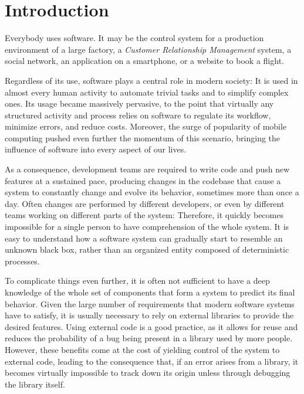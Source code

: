 
\chapter{Introduction}\label{ch:introduction}

Everybody uses software.
It may be the control system for a production environment of a large factory, a \emph{Customer Relationship Management} system, a social network, an application on a smartphone, or a website to book a flight.

Regardless of its use, software plays a central role in modern society: It is used in almost every human activity to automate trivial tasks and to simplify complex ones.
Its usage became massively pervasive, to the point that virtually any structured activity and process relies on software to regulate its workflow, minimize errors, and reduce costs.
Moreover, the surge of popularity of mobile computing pushed even further the momentum of this scenario, bringing the influence of software into every aspect of our lives.

As a consequence, development teams are required to write code and push new features at a sustained pace, producing changes in the codebase that cause a system to constantly change and evolve its behavior, sometimes more than once a day.
Often changes are performed by different developers, or even by different teams working on different parts of the system: Therefore, it quickly becomes impossible for a single person to have comprehension of the whole system.
It is easy to understand how a software system can gradually start to resemble an unknown black box, rather than an organized entity composed of deterministic processes.

To complicate things even further, it is often not sufficient to have a deep knowledge of the whole set of components that form a system to predict its final behavior.
Given the large number of requirements that modern software systems have to satisfy, it is usually necessary to rely on external libraries to provide the desired features.
Using external code is a good practice, as it allows for reuse and reduces the probability of a bug being present in a library used by more people.
However, these benefits come at the cost of yielding control of the system to external code, leading to the consequence that, if an error arises from a library, it becomes virtually impossible to track down its origin unless through debugging the library itself.

